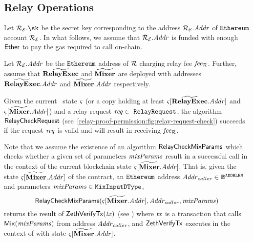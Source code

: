 \subsection{Relay Operations}

Let $\relayEthAccount.\sk$ be the secret key corresponding to the address $\mathcal{{R}_{E}}.\mathit{Addr}$ of $\texttt{Ethereum}$ account $\mathcal{{R}_{E}}$.
In what follows, we assume that $\mathcal{{R}_{E}}.\mathit{Addr}$ is funded with enough $\mathsf{Ether}$ to pay the gas required to call \relayexec{} on-chain.


Let $\mathcal{{R}_{E}}{}.\mathit{Addr}$ be the $\texttt{Ethereum}$ address of $\mathcal{R}$ charging relay fee $\mathit{fee_{\mathcal{R}}}$. Further, assume that $\widetilde{\mathbf{RelayExec}}$ and $\widetilde{\mathbf{Mixer}}$ are deployed with addresses $\widetilde{\mathbf{RelayExec}}{}.\mathit{Addr}$ and $\widetilde{\mathbf{Mixer}}.\mathit{Addr}$ respectively.

Given the current \ethereum~state $\mathit{\varsigma}$ (or a copy holding at least $\mathit{\varsigma}[\widetilde{\mathbf{RelayExec}}{}.\mathit{Addr}]$ and $\mathit{\varsigma}[\widetilde{\mathbf{Mixer}}.\mathit{Addr}]$) and a relay request $\mathit{req} \in\ {\mathtt{RelayRequest}}$, the algorithm $\mathsf{RelayCheckRequest}$ (see~\cref{relay-proof-permission:fig:relay-request-check}) succeeds if the request $\mathit{req}$ is valid and will result in \relayEthAccount{} receiving $\mathit{fee_{\mathcal{R}}}$.

Note that we assume the existence of an algorithm $\mathsf{RelayCheckMixParams}$ which checks whether a given set of \mix{} parameters $\mathit{mixParams}$ result in a successful \mix{} call in the context of the current blockchain state $\mathit{\varsigma}[\widetilde{\mathbf{Mixer}}{}.\mathit{Addr}]$. That is, given the state $\mathit{\varsigma}[\widetilde{\mathbf{Mixer}}{}.\mathit{Addr}]$ of the \mixer{} contract, an $\texttt{Ethereum}$ address $\mathit{Addr}_{caller} \in \mathbb{B}^{\mathtt{ADDRLEN}}$ and \mix{} parameters $\mathit{mixParams} \in {\mathtt{MixInputDType}}$,
\[
  \mathsf{RelayCheckMixParams}(\mathit{\varsigma}[\widetilde{\mathbf{Mixer}}{}.\mathit{Addr}], \mathit{Addr}_{caller}, \mathit{mixParams})
\]
returns the result of $\mathsf{ZethVerifyTx}(\mathit{tx})$ (see \cite[Section 2.5]{zeth-protocol}) where $\mathit{tx}$ is a transaction that calls $\mathsf{Mix}(\mathit{mixParams})$ from address $\mathit{Addr}_{caller}$, and $\mathsf{ZethVerifyTx}$ executes in the context of \mixer{} with state $\mathit{\varsigma}[\widetilde{\mathbf{Mixer}}{}.\mathit{Addr}]$.

\newcommand{\mixeraddr}{\ensuremath{\varstyle{mixerAddr}}\xspace}
\newcommand{\relayproxyaddr}{\ensuremath{\varstyle{relayProxyAddr}}\xspace}

